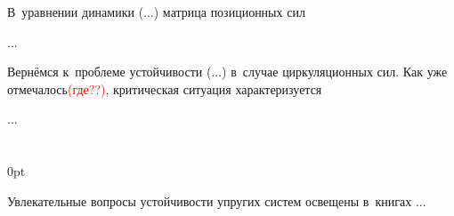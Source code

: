 \label{section:nonconservativeproblemsofstability}

\begin{otherlanguage}{russian}

В~уравнении динамики (...) матрица позиционных сил

...



\end{otherlanguage}



\label{section:caseofmultipleroots}

\begin{otherlanguage}{russian}

Вернёмся к~проблеме устойчивости (...) в~случае циркуляционных сил.
Как уже отмечалось\textcolor{red}{(где??)}, критическая ситуация характеризуется

...



\end{otherlanguage}

\section*{\small \wordforbibliography}

\begin{changemargin}{\parindent}{0pt}
\fontsize{10}{12}\selectfont

\begin{otherlanguage}{russian}

Увлекательные вопросы устойчивости упругих систем освещены в~книгах ...

\end{otherlanguage}

\end{changemargin}
